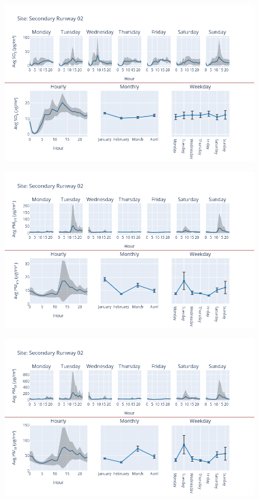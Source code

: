 \documentclass[12pt, oneside]{book}
\begin{document}
{ 
{\begin{figure}[H] 
 \centering 
\includegraphics[width=.88\textwidth, keepaspectratio]{image173} 
 \end{figure}}{} 

{\begin{figure}[H] 
 \centering 
\includegraphics[width=.88\textwidth, keepaspectratio]{image174} 
 \end{figure}}{} 

{\begin{figure}[H] 
 \centering 
\includegraphics[width=.88\textwidth, keepaspectratio]{image175} 
 \end{figure}}{} 

}
\end{document}
